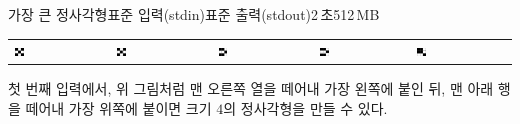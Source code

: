 \begin{problem}{가장 큰 정사각형}{표준 입력(stdin)}{표준 출력(stdout)}{2\,초}{512\,MB}
\Note
\begin{center}
\begin{tabular}{lllll}
  \includegraphics[width=0.1\textwidth]{../pictures/1.png} & \includegraphics[width=0.1\textwidth]{../pictures/2.png} & \includegraphics[width=0.1\textwidth]{../pictures/3.png} & \includegraphics[width=0.1\textwidth]{../pictures/4.png} & \includegraphics[width=0.1\textwidth]{../pictures/5.png}
\end{tabular}
\end{center}

첫 번째 입력에서, 위 그림처럼 맨 오른쪽 열을 떼어내 가장 왼쪽에 붙인 뒤, 맨 아래 행을 떼어내 가장 위쪽에 붙이면 크기 $4$의 정사각형을 만들 수 있다.

\end{problem}
